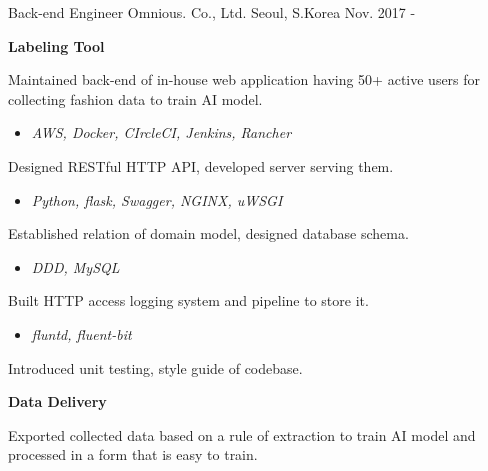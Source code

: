 

\begin{cventries}

  \cventry
    {Back-end Engineer} %
    {Omnious. Co., Ltd.} %
    {Seoul, S.Korea} %
    {Nov. 2017 - } %
    {
      \begin{cvitems} %
        \item[] {\textbf{Labeling Tool}}
        \item {Maintained back-end of in-house web application having 50+ active users for collecting fashion data to train AI model.}
        \begin{itemize}
          \item \textit{AWS, Docker, CIrcleCI, Jenkins, Rancher}
        \end{itemize}
        \item {Designed RESTful HTTP API, developed server serving them.}
        \begin{itemize}
          \item \textit{Python, flask, Swagger, NGINX, uWSGI}
        \end{itemize}
        \item {Established relation of domain model, designed database schema.}
        \begin{itemize}
          \item \textit{DDD, MySQL}
        \end{itemize}
        \item {Built HTTP access logging system and pipeline to store it.}
        \begin{itemize}
          \item \textit{fluntd, fluent-bit}
        \end{itemize}
        \item {Introduced unit testing, style guide of codebase.}
        \item[] {\textbf{Data Delivery}}
        \item {Exported collected data based on a rule of extraction to train AI model and processed in a form that is easy to train.}

\end{cvitems}}
\end{cventries}
